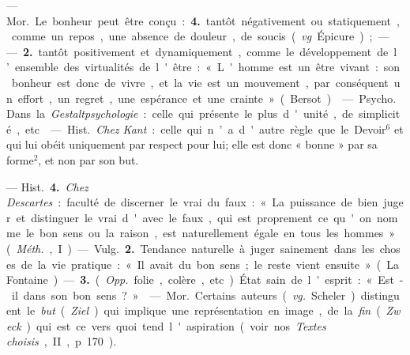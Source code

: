 \begin{itemize}[leftmargin=1cm, label=, itemsep=1pt]
 — \si{Mor.} Le bonheur peut
être conçu : {\bf 4.} tantôt négativement
ou statiquement, comme un repos,
une absence de douleur, de soucis
({\it vg}. Épicure); —— {\bf 2.} tantôt positivement et dynamiquement, comme le
développement de l’ensemble des
virtualités de l'être : « L'homme est
un être vivant : son bonheur est
donc de vivre, et la vie est un mouvement, par conséquent un effort,
un regret, une espérance et une
crainte » (Bersot).

 — \si{Psycho.} Dans la
{\it Gestaltpsychologie} : celle qui présente
le plus d'unité, de simplicité, etc.

 — \si{Hist.} {\it Chez Kant} :
celle qui n’a d'autre règle que le
Devoir$^6$ et qui lui obéit uniquement
par respect pour lui; elle est donc
« bonne » par sa forme$^2$, et non par
son but.

 — \si{Hist.} {\bf 4.} {\it Chez Descartes} :
faculté de discerner le vrai du faux :
« La puissance de bien juger et distinguer le vrai d'avec le faux, qui
est proprement ce qu'on nomme le
bon sens ou la raison, est naturellement égale en tous les hommes »
({\it Méth.}, I).

— \si{Vulg.} {\bf 2.} Tendance naturelle à
juger sainement dans les choses de
la vie pratique : « Il avait du bon
sens; le reste vient ensuite » (La
Fontaine). — {\bf 3.} ({\it Opp.} folie, colère,
etc.). État sain de l'esprit : « Est-il
dans son bon sens ? »

 — \si{Mor.} Certains auteurs ({\it vg.}
Scheler) distinguent le {\it but} ({\it Ziel}) qui
implique une représentation en
image, de la {\it fin} ({\it Zweck}) qui est ce
vers quoi tend l'aspiration (voir nos
{\it Textes choisis}, II, p. 170).

	\end{itemize}
